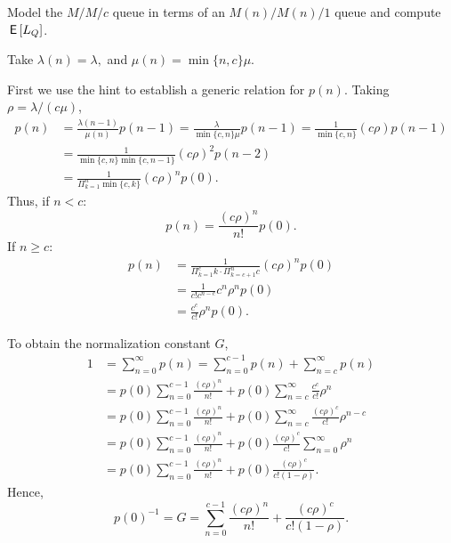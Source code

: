 \documentclass[companion]{subfiles}
\begin{document}
\begin{exercise}
 Model the $M/M/c$ queue in terms of an $M(n)/M(n)/1$ queue and compute $\,\mathsf{E}\left[L_Q\right]$. 
\begin{hint}
Take $\lambda(n) = \lambda,$ and $\mu(n) = \min\{n, c\} \mu$. 
\end{hint}
\begin{solution}
First we use the hint to establish a generic relation for $p(n)$. Taking $\rho=\lambda/(c\mu)$, 
 \begin{align*}
 p(n) 
 &= \frac{\lambda(n-1)}{\mu(n)}p(n-1) 
 = \frac{\lambda}{\min\{c, n\} \mu }p(n-1) 
 = \frac{1}{\min\{c, n\}}(c\rho) p(n-1) \\
 & = \frac{1}{\min\{c, n\}\min\{c, n-1\}}(c\rho)^2 p(n-2) \\
 &= \frac{1}{\Pi_{k=1}^{n}\min\{c, k\}}(c\rho)^{n} p(0). 
 \end{align*}
Thus, if $n<c$:
\begin{equation}
 p(n)
 = \frac{(c\rho)^n}{n!} p(0).
\end{equation}
If $n\geq c$:
\begin{align*}
 p(n) 
&= \frac{1}{\Pi_{k=1}^{c} k \cdot \Pi_{k=c+1}^{n} c}(c\rho)^{n} p(0) \\
&= \frac{1}{c! c^{n-c}}c^n\rho^{n} p(0) \\
&= \frac{c^c}{c!}\rho^{n} p(0).
\end{align*}


To obtain the normalization constant $G$,
\begin{align*}
1 &= \sum_{n=0}^\infty p(n) 
= \sum_{n=0}^{c-1} p(n) + \sum_{n=c}^\infty p(n) \\
&=p(0) \sum_{n=0}^{c-1}\frac{(c\rho)^n}{n!} + 
 p(0)\sum_{n=c}^{\infty} \frac{c^c}{c!} \rho^{n} \\
&=p(0)\sum_{n=0}^{c-1}\frac{(c\rho)^n}{n!} + 
 p(0) \sum_{n=c}^{\infty} \frac{(c\rho)^c}{c!} \rho^{n-c} \\
&= 
p(0)\sum_{n=0}^{c-1}\frac{(c\rho)^n}{n!} + 
p(0)\frac{(c\rho)^c}{c!} \sum_{n=0}^{\infty} \rho^n \\
&= 
p(0) \sum_{n=0}^{c-1}\frac{(c\rho)^n}{n!} + 
p(0)\frac{(c\rho)^c}{c!(1-\rho)}.
\end{align*}
Hence, 
\begin{equation}\label{eq:501}
p(0)^{-1} =  G= \sum_{n=0}^{c-1}\frac{(c\rho)^n}{n!} + \frac{(c\rho)^c}{c!(1-\rho)}.
\end{equation}


\end{solution}
\end{exercise}
\end{document}
